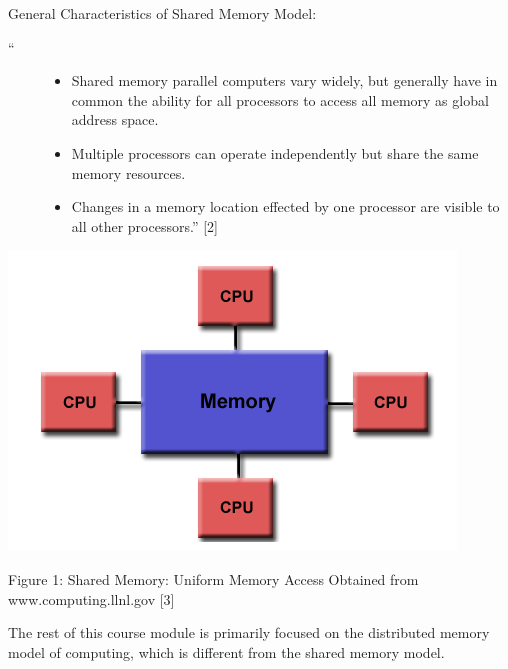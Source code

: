 \documentclass[letterpaper,10pt,openany,oneside]{sphinxmanual}
\begin{document}
General Characteristics of Shared Memory Model:
\begin{description}
\item[{``}] \leavevmode\begin{itemize}
\item {} 
Shared memory parallel computers vary widely, but generally have in common the ability for all processors to access all memory as global address space.

\item {} 
Multiple processors can operate independently but share the same memory resources.

\item {} 
Changes in a memory location effected by one processor are visible to all other processors.'' {[}2{]}

\end{itemize}

\end{description}

{\hfill\includegraphics{SharedMemoryUMA.png}\hfill}

\begin{center}Figure 1: Shared Memory: Uniform Memory Access Obtained from www.computing.llnl.gov {[}3{]}
\end{center}
The rest of this course module is primarily focused on the distributed memory model of computing, which is different from the shared memory model.
\end{document}
